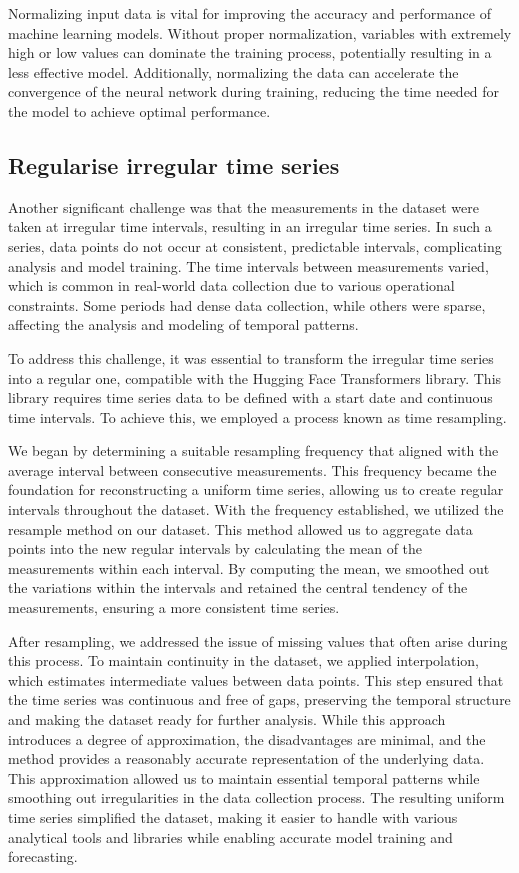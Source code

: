Normalizing input data is vital for improving the accuracy and performance of machine learning models. Without proper normalization, variables with extremely high or low values can dominate the training process, potentially resulting in a less effective model. Additionally, normalizing the data can accelerate the convergence of the neural network during training, reducing the time needed for the model to achieve optimal performance.

\subsection{Regularise irregular time series}

Another significant challenge was that the measurements in the dataset were taken at irregular time intervals, resulting in an irregular time series. In such a series, data points do not occur at consistent, predictable intervals, complicating analysis and model training. The time intervals between measurements varied, which is common in real-world data collection due to various operational constraints. Some periods had dense data collection, while others were sparse, affecting the analysis and modeling of temporal patterns.

To address this challenge, it was essential to transform the irregular time series into a regular one, compatible with the Hugging Face Transformers library. This library requires time series data to be defined with a start date and continuous time intervals. To achieve this, we employed a process known as time resampling.

We began by determining a suitable resampling frequency that aligned with the average interval between consecutive measurements. This frequency became the foundation for reconstructing a uniform time series, allowing us to create regular intervals throughout the dataset. With the frequency established, we utilized the resample method on our dataset. This method allowed us to aggregate data points into the new regular intervals by calculating the mean of the measurements within each interval. By computing the mean, we smoothed out the variations within the intervals and retained the central tendency of the measurements, ensuring a more consistent time series.

After resampling, we addressed the issue of missing values that often arise during this process. To maintain continuity in the dataset, we applied interpolation, which estimates intermediate values between data points. This step ensured that the time series was continuous and free of gaps, preserving the temporal structure and making the dataset ready for further analysis.
While this approach introduces a degree of approximation, the disadvantages are minimal, and the method provides a reasonably accurate representation of the underlying data. This approximation allowed us to maintain essential temporal patterns while smoothing out irregularities in the data collection process. The resulting uniform time series simplified the dataset, making it easier to handle with various analytical tools and libraries while enabling accurate model training and forecasting.

